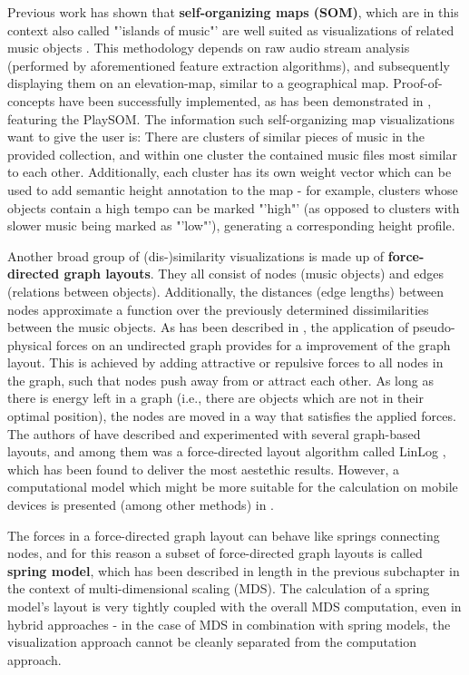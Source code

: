 Previous work has shown that \textbf{self-organizing maps (SOM)}, which are in this context also called "'islands of music"' are well suited as visualizations of related music objects \cite{Cooper:2006:VAM}. This methodology depends on raw audio stream analysis (performed by aforementioned feature extraction algorithms), and subsequently displaying them on an elevation-map, similar to a geographical map. Proof-of-concepts have been successfully implemented, as has been demonstrated in \cite{NeuDitRau_05ismir}, featuring the PlaySOM. The information such self-organizing map visualizations want to give the user is: There are clusters of similar pieces of music in the provided collection, and within one cluster the contained music files most similar to each other. Additionally, each cluster has its own weight vector which can be used to add semantic height annotation to the map - for example, clusters whose objects contain a high tempo can be marked "'high"' (as opposed to clusters with slower music being marked as "'low"'), generating a corresponding height profile.

Another broad group of (dis-)similarity visualizations is made up of \textbf{force-directed graph layouts}. They all consist of nodes (music objects) and edges (relations between objects). Additionally, the distances (edge lengths) between nodes approximate a function over the previously determined dissimilarities between the music objects.
As has been described in \cite{gansner:1998}, the application of pseudo-physical forces on an undirected graph provides for a improvement of the graph layout. This is achieved by adding attractive or repulsive forces to all nodes in the graph, such that nodes push away from or attract each other. As long as there is energy left in a graph (i.e., there are objects which are not in their optimal position), the nodes are moved in a way that satisfies the applied forces. The authors of \cite{Muelder:2010fk} have described and experimented with several graph-based layouts, and among them was a force-directed layout algorithm called LinLog \cite{noack:2003}, which has been found to deliver the most aestethic results. However, a computational model which might be more suitable for the calculation on mobile devices is presented (among other methods) in \cite{Kobourov04}.

The forces in a force-directed graph layout can behave like springs connecting nodes, and for this reason a subset of force-directed graph layouts is called \textbf{spring model}, which has been described in length in the previous subchapter in the context of multi-dimensional scaling (MDS). The calculation of a spring model's layout is very tightly coupled with the overall MDS computation, even in hybrid approaches \cite{Morrison:2003:FMS} - in the case of MDS in combination with spring models, the visualization approach cannot be cleanly separated from the computation approach.

